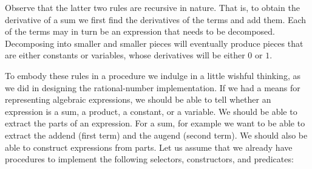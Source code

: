 Observe that the latter two rules are recursive in nature.
That is, to obtain the derivative of a sum we first find the derivatives of the terms and add them.
Each of the terms may in turn be an expression that needs to be decomposed.
Decomposing into smaller and smaller pieces will eventually produce pieces that are either constants or variables, whose derivatives will be either \( 0 \) or \( 1 \).

To embody these rules in a procedure we indulge in a little wishful thinking, as we did in designing the rational-number implementation.
If we had a means for representing algebraic expressions, we should be able to tell whether an expression is a sum, a product, a constant, or a variable.
We should be able to extract the parts of an expression.
For a sum, for example we want to be able to extract the addend (first term) and the augend (second term).
We should also be able to construct expressions from parts.
Let us assume that we already have procedures to implement the following selectors, constructors, and predicates:

